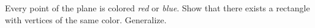 Every point of the plane is colored \emph{red} or \emph{blue}. Show that there exists a rectangle with vertices of the same color. Generalize.
